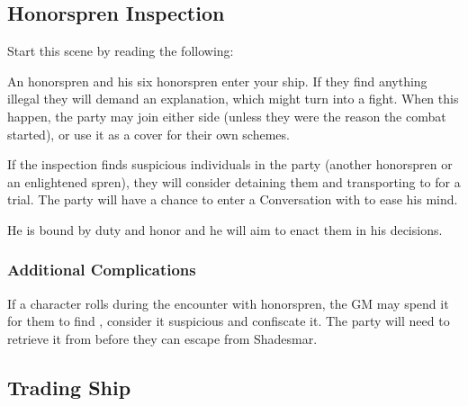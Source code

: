 \subsection{Honorspren Inspection}
\label{ssec:shadesmarSeaEncountersHonorspren}

Start this scene by reading the following:


An honorspren \enemySprenCaptain{} and his six honorspren \enemyTrueSpren{} enter your ship. If they find anything illegal they will demand an explanation, which might turn into a fight. When this happen, the party may join either side (unless they were the reason the combat started), or use it as a cover for their own schemes.

If the inspection finds suspicious individuals in the party (another honorspren or an enlightened spren), they will consider detaining them and transporting to \locationFidelity{} for a trial. The party will have a chance to enter a Conversation with \npcHonorsprenCaptain{} to ease his mind.

 He is bound by duty and honor and he will aim to enact them in his decisions.


\subsubsection{Additional Complications}

If a character rolls \iconComp{} during the encounter with honorspren, the GM may spend it for them to find \lootGateOpener{}, consider it suspicious and confiscate it. The party will need to retrieve it from \npcHonorsprenCaptain{} before they can escape from Shadesmar.





\subsection{Trading Ship}
\label{ssec:shadesmarSeaEncountersTraders}


